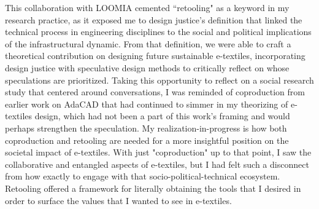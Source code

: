This collaboration with LOOMIA cemented ``retooling" as a keyword in my research practice, as it exposed me to design justice's definition that linked the technical process in engineering disciplines to the social and political implications of the infrastructural dynamic. From that definition, we were able to craft a theoretical contribution on designing future sustainable e-textiles, incorporating design justice with speculative design methods to critically reflect on whose speculations are prioritized. 
Taking this opportunity to reflect on a social research study that centered around conversations, I was reminded of coproduction from earlier work on AdaCAD that had continued to simmer in my theorizing of e-textiles design, which had not been a part of this work's framing and would perhaps strengthen the speculation. My realization-in-progress is how both coproduction and retooling are needed for a more insightful position on the societal impact of e-textiles. With just "coproduction" up to that point, I saw the collaborative and entangled aspects of e-textiles, but I had felt such a disconnect from how exactly to engage with that socio-political-technical ecosystem. Retooling offered a framework for literally obtaining the tools that I desired in order to surface the values that I wanted to see in e-textiles.
